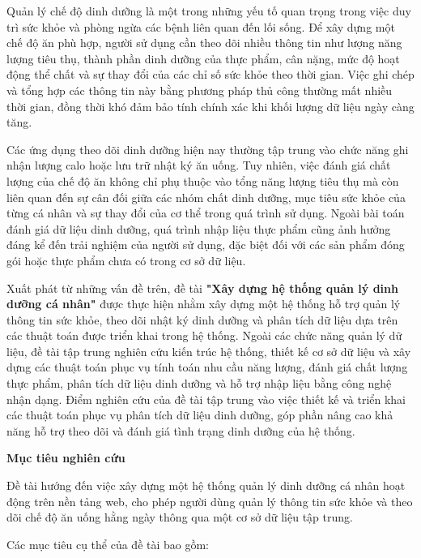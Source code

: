 Quản lý chế độ dinh dưỡng là một trong những yếu tố quan trọng trong việc duy trì sức khỏe và phòng ngừa các bệnh liên quan đến lối sống. Để xây dựng một chế độ ăn phù hợp, người sử dụng cần theo dõi nhiều thông tin như lượng năng lượng tiêu thụ, thành phần dinh dưỡng của thực phẩm, cân nặng, mức độ hoạt động thể chất và sự thay đổi của các chỉ số sức khỏe theo thời gian. Việc ghi chép và tổng hợp các thông tin này bằng phương pháp thủ công thường mất nhiều thời gian, đồng thời khó đảm bảo tính chính xác khi khối lượng dữ liệu ngày càng tăng.

Các ứng dụng theo dõi dinh dưỡng hiện nay thường tập trung vào chức năng ghi nhận lượng calo hoặc lưu trữ nhật ký ăn uống. Tuy nhiên, việc đánh giá chất lượng của chế độ ăn không chỉ phụ thuộc vào tổng năng lượng tiêu thụ mà còn liên quan đến sự cân đối giữa các nhóm chất dinh dưỡng, mục tiêu sức khỏe của từng cá nhân và sự thay đổi của cơ thể trong quá trình sử dụng. Ngoài bài toán đánh giá dữ liệu dinh dưỡng, quá trình nhập liệu thực phẩm cũng ảnh hưởng đáng kể đến trải nghiệm của người sử dụng, đặc biệt đối với các sản phẩm đóng gói hoặc thực phẩm chưa có trong cơ sở dữ liệu.

Xuất phát từ những vấn đề trên, đề tài \textbf{"Xây dựng hệ thống quản lý dinh dưỡng cá nhân"} được thực hiện nhằm xây dựng một hệ thống hỗ trợ quản lý thông tin sức khỏe, theo dõi nhật ký dinh dưỡng và phân tích dữ liệu dựa trên các thuật toán được triển khai trong hệ thống. Ngoài các chức năng quản lý dữ liệu, đề tài tập trung nghiên cứu kiến trúc hệ thống, thiết kế cơ sở dữ liệu và xây dựng các thuật toán phục vụ tính toán nhu cầu năng lượng, đánh giá chất lượng thực phẩm, phân tích dữ liệu dinh dưỡng và hỗ trợ nhập liệu bằng công nghệ nhận dạng. Điểm nghiên cứu của đề tài tập trung vào việc thiết kế và triển khai các thuật toán phục vụ phân tích dữ liệu dinh dưỡng, góp phần nâng cao khả năng hỗ trợ theo dõi và đánh giá tình trạng dinh dưỡng của hệ thống.

\textbf{Mục tiêu nghiên cứu}

Đề tài hướng đến việc xây dựng một hệ thống quản lý dinh dưỡng cá nhân hoạt động trên nền tảng web, cho phép người dùng quản lý thông tin sức khỏe và theo dõi chế độ ăn uống hằng ngày thông qua một cơ sở dữ liệu tập trung.

Các mục tiêu cụ thể của đề tài bao gồm:

